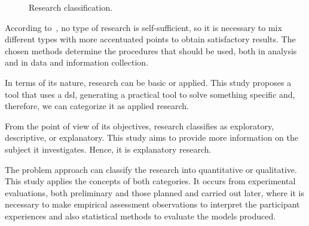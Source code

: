 \begin{figure}[!htb]
    \centering
    \caption{Research classification.}
    
    \label{fig:ResearchClassification}
\end{figure}

According to~\cite{Prodanov:2013}, no type of research is self-sufficient, so it is necessary to mix different types with more accentuated points to obtain satisfactory results.
The chosen methods determine the procedures that should be used, both in analysis and in data and information collection.

In terms of its nature, research can be basic or applied.
This study proposes a tool that uses a \ac{dsl}, generating a practical tool to solve something specific and, therefore, we can categorize it as applied research.

From the point of view of its objectives, research classifies as exploratory, descriptive, or explanatory. 
This study aims to provide more information on the subject it investigates. Hence, it is explanatory research.

The problem approach can classify the research into quantitative or qualitative.
This study applies the concepts of both categories.
It occurs from experimental evaluations, both preliminary and those planned and carried out later, where it is necessary to make empirical assessment observations to interpret the participant experiences and also statistical methods to evaluate the models produced.

